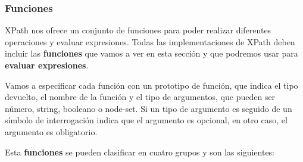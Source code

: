 \subsubsection{Funciones}

XPath nos ofrece un conjunto de funciones para poder realizar diferentes operaciones y evaluar expresiones. Todas las implementaciones de XPath deben incluir las \textbf{funciones} que vamos a ver en esta sección y que podremos usar para \textbf{evaluar expresiones}.

Vamos a especificar cada función con un prototipo de función, que indica el tipo devuelto, el nombre de la función y el tipo de argumentos, que pueden ser número, string, booleano o node-set. Si un tipo de argumento es seguido de un símbolo de interrogación indica que el argumento es opcional, en otro caso, el argumento es obligatorio.

Esta \textbf{funciones} se pueden clasificar en cuatro grupos y son las siguientes:

